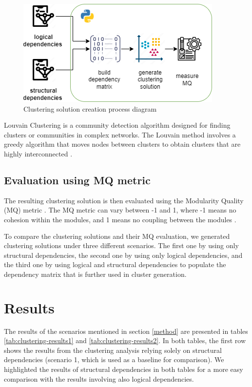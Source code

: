 \documentclass[conference, a4paper]{IEEEtran}
\begin{document}
\begin{figure}[H]
\centering
\includegraphics[width=\columnwidth]{clustering-generation.png}
\caption{Clustering solution creation process diagram}
\label{fig:clustering-gen}
\end{figure}

Louvain Clustering is a community detection algorithm designed for finding clusters or communities in complex networks. The Louvain method involves a greedy algorithm that moves nodes between clusters to obtain clusters that are highly interconnected \cite{louvain_clustering}.

\subsection{Evaluation using MQ metric}
The resulting clustering solution is then evaluated using the Modularity Quality (MQ) metric . The MQ metric can vary between -1 and 1, where -1 means no cohesion within the modules, and 1 means no coupling between the modules \cite{mqmetric}.

To compare the clustering solutions and their MQ evaluation, we generated clustering solutions under three different scenarios. The first one by using only structural dependencies, the second one by using only logical dependencies, and the third one by using logical and structural dependencies to populate the dependency matrix that is further used in cluster generation.


\section{Results}
\label{results}


The results of the scenarios mentioned in section \ref{method} are presented in tables \ref{tab:clustering-results1} and \ref{tab:clustering-results2}.
 In both tables, the first row shows the results from the clustering analysis relying solely on structural dependencies (scenario 1, which is used as a baseline for comparison). We highlighted the results of structural dependencies in both tables for a more easy comparison with the results involving also logical dependencies.
\end{document}
